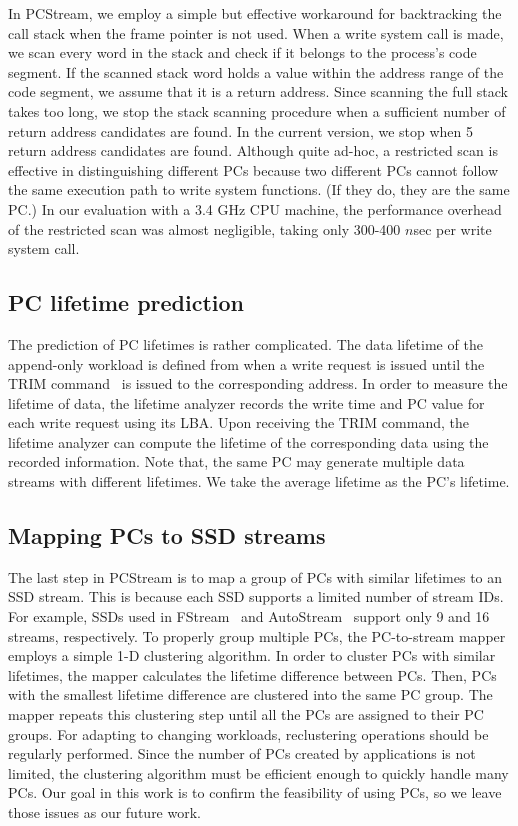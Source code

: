 In \textsf{\small PCStream}, we employ a simple but effective workaround 
for backtracking the call stack when the frame pointer is not used.
When a write system call is made, we scan every word in the stack and check
if it belongs to the process's code segment.  If the scanned stack word holds a
value within the address range of the code segment, we assume that it is a
return address.  Since scanning the full stack takes too long, we stop the
stack scanning procedure when a sufficient number of return address candidates
are found.  In the current version, we stop when 5 return address candidates
are found.  Although quite ad-hoc, a restricted scan is effective in
distinguishing different PCs because two different PCs
cannot follow the same execution path to write system functions.  
(If they do, they are the same PC.) In our evaluation
with a 3.4 GHz CPU machine, the performance overhead of the restricted scan was
almost negligible, taking only 300-400 $n$sec per write system call.

\subsection{PC lifetime prediction}

The prediction of PC lifetimes is rather complicated. 
The data lifetime of the append-only workload is defined 
from when a write request is issued until the TRIM command~\cite{TRIM} is issued to 
the corresponding address.
In order to measure the lifetime of data, the lifetime analyzer 
records the write time and PC value for each write request using its LBA.
Upon receiving the TRIM command, the lifetime analyzer can compute the 
lifetime of the corresponding data using the recorded information.
Note that, the
same PC may generate multiple data streams with different lifetimes.
We take the average lifetime as the PC's lifetime.

\subsection{Mapping PCs to SSD streams}

The last step in \textsf{\small PCStream} is to map
a group of PCs with similar lifetimes to an SSD stream.
This is because each SSD supports a limited number of stream IDs. For
example, SSDs used in \textsf{\small FStream}~\cite{FStream} and \textsf{\small AutoStream}~\cite{AutoStream}
support only 9 and 16 streams, respectively. To properly group multiple PCs,
the PC-to-stream mapper employs a simple 1-D clustering algorithm. 
In order to cluster PCs with similar lifetimes, the mapper calculates the 
lifetime difference between PCs.
Then, PCs with the smallest lifetime difference are clustered into the same PC group. 
The mapper repeats this clustering step until all the PCs are assigned to their PC groups.
For adapting to changing
workloads, reclustering operations should be regularly performed. Since the
number of PCs created by applications is not limited, the clustering algorithm
must be efficient enough to quickly handle many PCs. Our goal in this work is
to confirm the feasibility of using PCs, so we leave
those issues as our future work.

